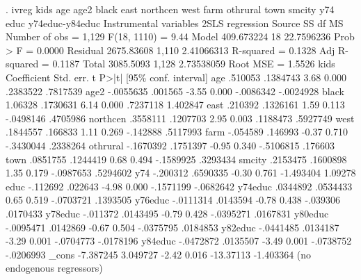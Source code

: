 . ivreg kids age age2 black east northcen west farm othrural town smcity y74 educ y74educ-y84educ
{\smallskip}
Instrumental variables 2SLS regression
{\smallskip}
      Source {\VBAR}       SS           df       MS      Number of obs   =     1,129
   F(18, 1110)     =      9.44
       Model {\VBAR}  409.673224        18  22.7596236   Prob > F        =    0.0000
    Residual {\VBAR}  2675.83608     1,110  2.41066313   R-squared       =    0.1328
   Adj R-squared   =    0.1187
       Total {\VBAR}   3085.5093     1,128  2.73538059   Root MSE        =    1.5526
{\smallskip}
        kids {\VBAR} Coefficient  Std. err.      t    P>|t|     [95\% conf. interval]
         age {\VBAR}    .510053   .1384743     3.68   0.000     .2383522    .7817539
        age2 {\VBAR}  -.0055635    .001565    -3.55   0.000    -.0086342   -.0024928
       black {\VBAR}    1.06328   .1730631     6.14   0.000     .7237118    1.402847
        east {\VBAR}    .210392   .1326161     1.59   0.113    -.0498146    .4705986
    northcen {\VBAR}   .3558111   .1207703     2.95   0.003     .1188473    .5927749
        west {\VBAR}   .1844557    .166833     1.11   0.269     -.142888    .5117993
        farm {\VBAR}   -.054589    .146993    -0.37   0.710    -.3430044    .2338264
    othrural {\VBAR}  -.1670392   .1751397    -0.95   0.340    -.5106815     .176603
        town {\VBAR}   .0851755   .1244419     0.68   0.494    -.1589925    .3293434
      smcity {\VBAR}   .2153475   .1600898     1.35   0.179    -.0987653    .5294602
         y74 {\VBAR}   -.200312   .6590335    -0.30   0.761    -1.493404     1.09278
        educ {\VBAR}   -.112692    .022643    -4.98   0.000    -.1571199   -.0682642
     y74educ {\VBAR}   .0344892   .0534433     0.65   0.519    -.0703721    .1393505
     y76educ {\VBAR}  -.0111314   .0143594    -0.78   0.438     -.039306    .0170433
     y78educ {\VBAR}   -.011372   .0143495    -0.79   0.428    -.0395271    .0167831
     y80educ {\VBAR}  -.0095471   .0142869    -0.67   0.504    -.0375795    .0184853
     y82educ {\VBAR}  -.0441485   .0134187    -3.29   0.001    -.0704773   -.0178196
     y84educ {\VBAR}  -.0472872   .0135507    -3.49   0.001    -.0738752   -.0206993
       _cons {\VBAR}  -7.387245   3.049727    -2.42   0.016    -13.37113   -1.403364
(no endogenous regressors)
{\smallskip}

